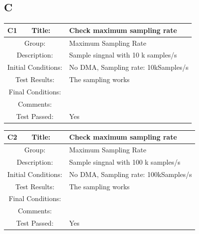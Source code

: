 \documentclass[12pt]{article}
\begin{document}
	\subsection{C}
	\begin{table}[H]
		\begin{center}
			\begin{tabular}{| m{2cm}|m{2cm}|m{12cm}|}
				\hline 
				\bf C1&\bf Title:&\bf Check maximum sampling rate\\ 
				\hline 
				\multicolumn{2}{|c|}{Group:}&Maximum Sampling Rate\\ 
				\hline 
				\multicolumn{2}{|c|}{Description:}&Sample singnal with 10 k samples/s\\ 
				\hline 
				\multicolumn{2}{|c|}{Initial Conditions:}&No DMA, Sampling rate: 10kSamples/s\\ 
				\hline 
				\multicolumn{2}{|c|}{Test Results:}&The sampling works\\ 
				\hline 
				\multicolumn{2}{|c|}{Final Conditions:}&\\ 
				\hline 
				\multicolumn{2}{|c|}{Comments:}&\\ 
				\hline 
				\multicolumn{2}{|c|}{Test Passed:}&Yes \\ 
				\hline 
			\end{tabular} 
		\end{center}
	\end{table}	
	\begin{table}[H]
		\begin{center}
			\begin{tabular}{| m{2cm}|m{2cm}|m{12cm}|}
				\hline 
				\bf C2&\bf Title:&\bf Check maximum sampling rate\\ 
				\hline 
				\multicolumn{2}{|c|}{Group:}&Maximum Sampling Rate\\ 
				\hline 
				\multicolumn{2}{|c|}{Description:}&Sample singnal with 100 k samples/s\\ 
				\hline 
				\multicolumn{2}{|c|}{Initial Conditions:}&No DMA, Sampling rate: 100kSamples/s\\ 
				\hline 
				\multicolumn{2}{|c|}{Test Results:}&The sampling works\\ 
				\hline 
				\multicolumn{2}{|c|}{Final Conditions:}&\\ 
				\hline 
				\multicolumn{2}{|c|}{Comments:}&\\ 
				\hline 
				\multicolumn{2}{|c|}{Test Passed:}&Yes \\ 
				\hline 
			\end{tabular} 
		\end{center}
	\end{table}	
\end{document}
